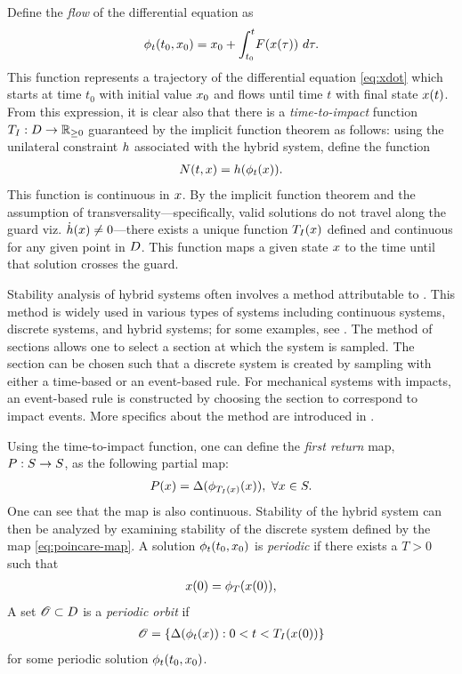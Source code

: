 Define the {\em flow} of the differential equation as
\begin{align*}
  \flowt(t_{0}, \x_{0}) = \x_{0} + \int_{t_{0}}^{t} \! \xf(\x\argtau) \ d\tau.
\end{align*}
%
This function represents a trajectory of the differential equation
\eqref{eq:xdot} which starts at time $t_{0}$ with initial value $x_{0}$ and
flows until time $t$ with final state $x(t)$.
%
From this expression, it is clear also that there is a {\em time-to-impact} function
$T_{I} : D \to \mathbb{R}_{\geq 0}$ guaranteed by the implicit function theorem as follows:
%
using the unilateral constraint $h$ associated with the hybrid system, define
the function
\begin{align*}
  N(t, x) = h(\phi_{t}(x)).
\end{align*}
%
This function is continuous in $x$.
%
By the implicit function theorem and the assumption of
transversality---specifically, valid solutions do not travel along the guard
viz. ${\dot {h}}(x) \ne 0$---there exists a unique function $T_{I}(x)$ defined and
continuous for any given point in $D$.\xspace
%
This function maps a given state $x$ to the time until that solution crosses
the guard.
%

Stability analysis of hybrid systems often involves a method attributable to
\Poincare{}.
%
This method is widely used in various types of systems including continuous
systems, discrete systems, and hybrid systems; for some examples, see
\cite{Guckenheimer1983, Parker1989, Perko2001, Grizzle2014}.
%
The method of \Poincare{} sections allows one to select a \Poincare{} section
at which the system is sampled.
%
The \Poincare{} section can be chosen such that a discrete system is created by
sampling with either a time-based or an event-based rule.
%
For mechanical systems with impacts, an event-based rule is constructed by
choosing the \Poincare{} section to correspond to impact events.\xspace
%
More specifics about the \Poincare{} method are introduced in
.

Using the time-to-impact function, one can define the {\em \Poincare{} first
  return} map, $P : S \to S$, as the following partial map:
%
\begin{align}
  \label{eq:poincare-map}
  P(x)  = \Delta(\phi_{T_{I}(x)}(x)), \ \forall x \in S.
\end{align}
%
One can see that the \Poincare{} map is also continuous.
%
Stability of the hybrid system can then be analyzed by examining stability of
the discrete system \cite{Morris2009} defined by the \Poincare{} map
\eqref{eq:poincare-map}.
%
A solution $\phi_{t}(t_{0}, x_{0})$ is {\em periodic} if there exists a $T > 0$
such that
\begin{align*}
  x(0) = \phi_{T}(x(0)),
\end{align*}
%
A set ${\mathscr O} \subset D$ is a {\em periodic orbit} if
\begin{align*}
  {\mathscr O} = \{ \Delta(\phi_{t}(x)) : 0 < t < T_{I}(x(0)) \}
\end{align*}
for some periodic solution $\phi_{t}(t_{0}, x_{0})$.

